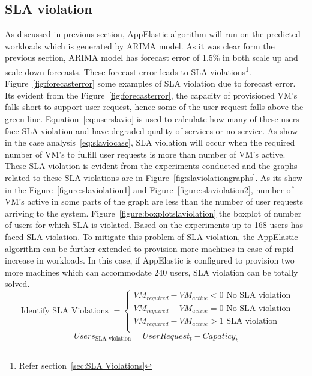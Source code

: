 \subsection{SLA violation}
\label{sub:SLA violation}
As discussed in previous section, AppElastic algorithm will run on the predicted workloads which is generated by ARIMA model. As it was clear form the previous section, ARIMA model has forecast error of 1.5\% in both scale up and scale down forecasts. These forecast error leads to SLA violations\footnote{Refer section~\ref{sec:SLA Violations}}. Figure~\ref{fig:forecasterror} some examples of SLA violation due to forecast error. Its evident from the Figure~\ref{fig:forecasterror}, the capacity of provisioned VM's falls short to support user request, hence some of the user request falls above the green line. Equation~\ref{eq:userslavio} is used to calculate how many of these users face SLA violation and have degraded quality of services or no service. As show in the case analysis~\ref{eq:slaviocase}, SLA violation will occur when the required number of VM's to fulfill user requests is more than number of VM's active. These SLA violation is evident from the experiments conducted and the graphs related to these SLA violations are in Figure~\ref{fig:slaviolationgraphs}. As its show in the Figure~\ref{figure:slaviolation1} and Figure~\ref{figure:slaviolation2}, number of VM's active in some parts of the graph are less than the number of user requests arriving to the system. Figure~\ref{figure:boxplotslaviolation} the boxplot of number of users for which SLA is violated. Based on the experiments up to 168 users has faced SLA violation. To mitigate this problem of SLA violation, the AppElastic algorithm can be further extended to provision more machines in case of rapid increase in workloads. In this case, if AppElastic is configured to provision two more machines which can accommodate 240 users, SLA violation can be totally solved.
\begin{equation}
\textrm{ Identify SLA Violations }=
  \begin{cases}
    VM_{required} - VM_{active} < 0 \textrm{ No SLA violation}\\
    VM_{required} - VM_{active} = 0 \textrm{ No SLA violation}\\
    VM_{required} - VM_{active} > 1 \textrm{ SLA violation}\\
\end{cases}
\label{eq:slaviocase}
\end{equation}
\begin{equation}
Users_{\textrm{SLA violation}} = UserRequest_{t} - Capaticy_{t}
\label{eq:userslavio}
\end{equation}
